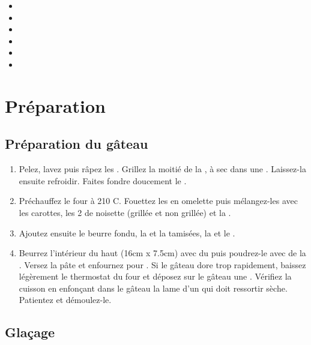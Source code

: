 \begin{itemize}[leftmargin=*]
\item {}
\item {}
\item {}
\item {}
\item {}
\item {}
\end{itemize}

\section*{Préparation}

\subsection*{Préparation du gâteau}

\begin{enumerate}
\item Pelez, lavez puis râpez les . Grillez la moitié de la , à sec dans une . Laissez-la ensuite refroidir. Faites fondre doucement le .
\item Préchauffez le four à 210 \textdegree{}C. Fouettez les  en omelette puis mélangez-les avec les carottes, les 2  de noisette (grillée et non grillée) et la .
\item Ajoutez ensuite le beurre fondu, la  et la  tamisées, la  et le .
\item Beurrez l'intérieur du  haut (16cm x 7.5cm) avec du  puis poudrez-le avec de la . Versez la pâte et enfournez pour . Si le gâteau dore trop rapidement, baissez légèrement le thermostat du four et déposez sur le gâteau une . Vérifiez la cuisson en enfonçant dans le gâteau la lame d'un  qui doit ressortir sèche. Patientez  et démoulez-le.
\end{enumerate}

\subsection*{Glaçage}

